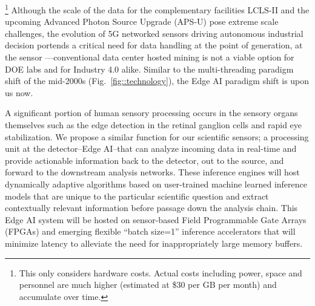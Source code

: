 \documentclass{article}
\begin{document}
\footnote{This only considers hardware costs. Actual costs including power, space and personnel are much higher (estimated at \$30 per GB per month) and accumulate over time.} 
Although the scale of the data for the complementary facilities LCLS-II and the upcoming Advanced Photon Source Upgrade (APS-U) pose extreme scale challenges, the evolution of 5G networked sensors driving autonomous industrial decision portends a critical need for data handling at the point of generation, at the sensor \cite{Gartner2018,NetworkWorld2019}---conventional data center hosted mining is not a viable option for DOE labs and for Industry 4.0 alike.
Similar to the multi-threading paradigm shift of the mid-2000s (Fig.~\ref{fig::technology}), the Edge AI paradigm shift is upon us now.

A significant portion of human sensory processing occurs in the sensory organs themselves such as the edge detection in the retinal ganglion cells and rapid eye stabilization.
We propose a similar function for our scientific sensors; a processing unit at the detector--Edge AI--that can analyze incoming data in real-time and provide actionable information back to the detector, out to the source, and forward to the downstream analysis networks.
These inference engines will host dynamically adaptive algorithms based on user-trained machine learned inference models that are unique to the particular scientific question and extract contextually relevant information before passage down the analysis chain.
This Edge AI system will be hosted on sensor-based Field Programmable Gate Arrays (FPGAs) and emerging flexible ``batch size=1'' inference accelerators \cite{edgetpu_benchmarks,edgetpu,waveCGRA,CGRAreview,seaofcores} that will minimize latency to alleviate the need for inappropriately large memory buffers.
\end{document}
